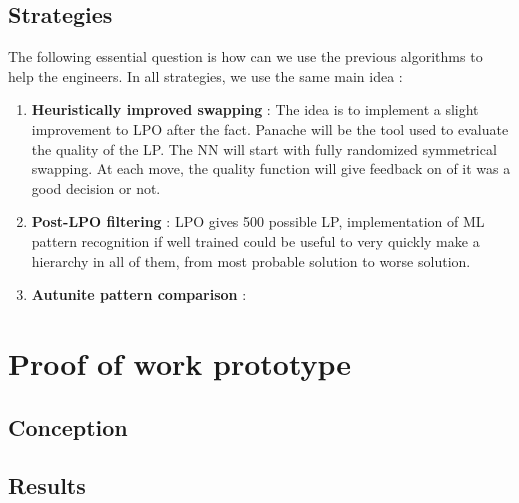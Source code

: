 \subsection{Strategies}
The following essential question is how can we use the previous algorithms to help the engineers. In all strategies, we use the same main idea : 
\begin{enumerate}
    \item \textbf{Heuristically improved swapping} : The idea is to implement a slight improvement to LPO after the fact. Panache will be the tool used to evaluate the quality of the LP. The NN will start with fully randomized symmetrical swapping. At each move, the quality function will give feedback on of it was a good decision or not. 
    \item \textbf{Post-LPO filtering} : LPO gives 500 possible LP, implementation of ML pattern recognition if well trained could be useful to very quickly make a hierarchy in all of them, from most probable solution to worse solution. 
    \item \textbf{Autunite pattern comparison} : 
\end{enumerate}

\section{Proof of work prototype}
\subsection{Conception}
\subsection{Results}